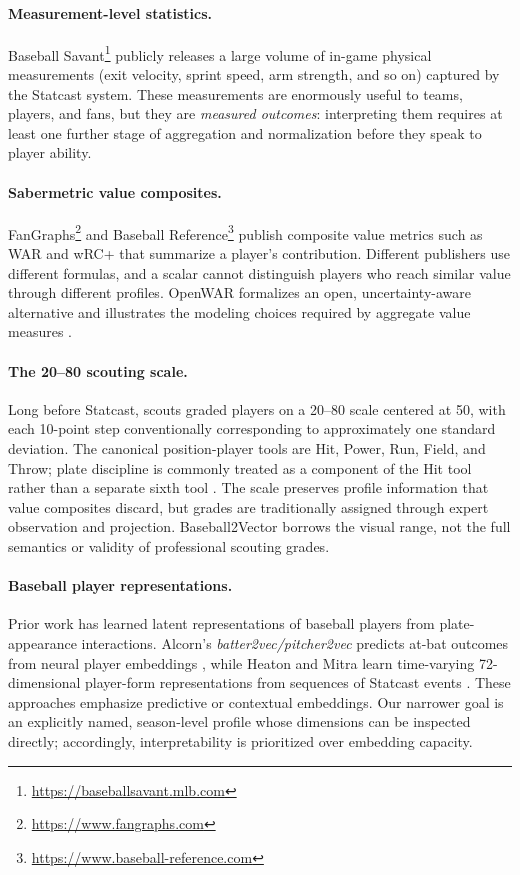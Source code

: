 \documentclass[10pt,twocolumn,letterpaper]{article}
\begin{document}
\paragraph{Measurement-level statistics.}
Baseball Savant\footnote{\url{https://baseballsavant.mlb.com}} publicly releases a large volume of in-game physical measurements (exit velocity, sprint speed, arm strength, and so on) captured by the Statcast system. These measurements are enormously useful to teams, players, and fans, but they are \emph{measured outcomes}: interpreting them requires at least one further stage of aggregation and normalization before they speak to player ability.

\paragraph{Sabermetric value composites.}
FanGraphs\footnote{\url{https://www.fangraphs.com}} and Baseball Reference\footnote{\url{https://www.baseball-reference.com}} publish composite value metrics such as WAR and wRC+ that summarize a player's contribution. Different publishers use different formulas, and a scalar cannot distinguish players who reach similar value through different profiles. OpenWAR formalizes an open, uncertainty-aware alternative and illustrates the modeling choices required by aggregate value measures \cite{baumer2015}.

\paragraph{The 20--80 scouting scale.}
Long before Statcast, scouts graded players on a 20--80 scale centered at 50, with each 10-point step conventionally corresponding to approximately one standard deviation. The canonical position-player tools are Hit, Power, Run, Field, and Throw; plate discipline is commonly treated as a component of the Hit tool rather than a separate sixth tool \cite{mcdaniel2014}. The scale preserves profile information that value composites discard, but grades are traditionally assigned through expert observation and projection. Baseball2Vector borrows the visual range, not the full semantics or validity of professional scouting grades.

\paragraph{Baseball player representations.}
Prior work has learned latent representations of baseball players from plate-appearance interactions. Alcorn's \emph{batter2vec/pitcher2vec} predicts at-bat outcomes from neural player embeddings \cite{alcorn2016}, while Heaton and Mitra learn time-varying 72-dimensional player-form representations from sequences of Statcast events \cite{heaton2021}. These approaches emphasize predictive or contextual embeddings. Our narrower goal is an explicitly named, season-level profile whose dimensions can be inspected directly; accordingly, interpretability is prioritized over embedding capacity.
\end{document}
